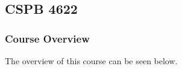 \clearpage

\renewcommand{\ChapTitle}{\CSPBML}
\renewcommand{\SectionTitle}{CSPB 4622}

\chapter{\ChapTitle}
\section{\SectionTitle}

\subsection{Course Overview}

The overview of this course can be seen below.

